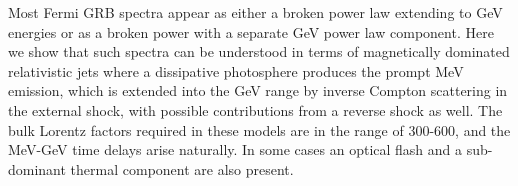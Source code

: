 


\bigskip



\bigskip

\noindent Most Fermi GRB spectra appear as either a broken power law extending to GeV energies or as a broken power with a separate GeV power law component. Here we show that such spectra can be understood in terms of magnetically dominated relativistic jets where a dissipative photosphere produces the prompt MeV emission, which is extended into the GeV range by inverse Compton scattering in the external shock, with possible contributions from a reverse shock as well. The bulk Lorentz factors required in these models are in the range of 300-600, and the MeV-GeV time delays arise naturally. In some cases an optical flash and a sub-dominant thermal component are also present.
